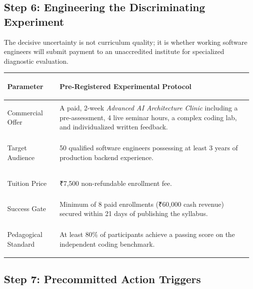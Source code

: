 \subsection{Step 6: Engineering the Discriminating Experiment}

The decisive uncertainty is not curriculum quality; it is whether working software engineers will submit payment to an unaccredited institute for specialized diagnostic evaluation.

\begin{tcolorbox}[
  enhanced,
  colback=BayesSurface!60,
  colframe=BayesBorder,
  boxrule=0.5pt,
  arc=3pt,
  left=3pt,right=3pt,top=3pt,bottom=3pt,
  boxsep=1pt
]
\scriptsize
\begin{tabularx}{\linewidth}{>{\bfseries\raggedright\arraybackslash}p{2.3cm} X}
\toprule
\textbf{Parameter} & \textbf{Pre-Registered Experimental Protocol} \\
\midrule
Commercial Offer & A paid, 2-week \textit{Advanced AI Architecture Clinic} including a pre-assessment, 4 live seminar hours, a complex coding lab, and individualized written feedback. \\
\addlinespace[2pt]
Target Audience & 50 qualified software engineers possessing at least 3 years of production backend experience. \\
\addlinespace[2pt]
Tuition Price & ₹7,500 non-refundable enrollment fee. \\
\addlinespace[2pt]
Success Gate & Minimum of 8 paid enrollments (₹60,000 cash revenue) secured within 21 days of publishing the syllabus. \\
\addlinespace[2pt]
Pedagogical Standard & At least 80\% of participants achieve a passing score on the independent coding benchmark. \\
\bottomrule
\end{tabularx}
\end{tcolorbox}

\subsection{Step 7: Precommitted Action Triggers}

